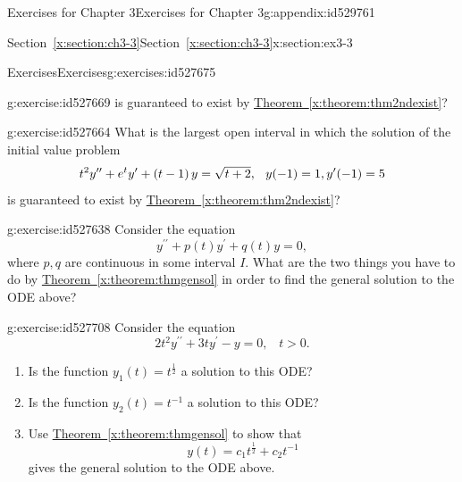 \documentclass[oneside,10pt,]{book}
\newcommand{\xreffont}{\relax}
\numberwithin{equation}{section}
\numberwithin{equation}{section}
\begin{document}
\begin{appendixptx}{Exercises for Chapter 3}{}{Exercises for Chapter 3}{}{}{g:appendix:id529761}
\begin{sectionptx}{Section~{\xreffont\ref*{x:section:ch3-3}}}{}{Section~{\xreffont\ref*{x:section:ch3-3}}}{}{}{x:section:ex3-3}
\begin{exercises-subsection-numberless}{Exercises}{}{Exercises}{}{}{g:exercises:id527675}
\begin{divisionexercise}{1}{}{}{g:exercise:id527669}
is guaranteed to exist by \hyperref[x:theorem:thm2ndexist]{Theorem~{\xreffont\ref{x:theorem:thm2ndexist}}}?%
\end{divisionexercise}%
\begin{divisionexercise}{2}{}{}{g:exercise:id527664}%
What is the largest open interval in which the solution of the initial value problem%
\begin{equation*}
t^{2}y^{\prime\prime}+e^{t}y^{\prime}+\left(t-1\right)y=\sqrt{t+2}, \hspace{.1in}
y(-1)=1,y^{\prime}(-1)=5
\end{equation*}
is guaranteed to exist by \hyperref[x:theorem:thm2ndexist]{Theorem~{\xreffont\ref{x:theorem:thm2ndexist}}}?%
\end{divisionexercise}%
\begin{divisionexercise}{3}{}{}{g:exercise:id527638}%
Consider the equation%
\begin{equation*}
y^{\prime\prime}+p(t)y^{\prime}+q(t)y=0,
\end{equation*}
where \(p,q\) are continuous in some interval \(I\). What are the two things you have to do by \hyperref[x:theorem:thmgensol]{Theorem~{\xreffont\ref{x:theorem:thmgensol}}} in order to find the general solution to the ODE above?%
\end{divisionexercise}%
\begin{divisionexercise}{4}{}{}{g:exercise:id527708}%
Consider the equation%
\begin{equation*}
2t^{2}y^{\prime\prime}+3ty^{\prime}-y=0,\,\,\,\,\,t>0.
\end{equation*}
%
%
\begin{enumerate}[label=(\alph*)]
\item{}Is the function \(y_{1}(t)=t^{\frac{1}{2}}\) a solution to this ODE?%
\item{}Is the function \(y_{2}(t)=t^{-1}\) a solution to this ODE?%
\item{}Use \hyperref[x:theorem:thmgensol]{Theorem~{\xreffont\ref{x:theorem:thmgensol}}} to show that%
\begin{equation*}
y(t)=c_{1}t^{\frac{1}{2}}+c_{2}t^{-1}
\end{equation*}
gives the general solution to the ODE above.%
\end{enumerate}
\end{divisionexercise}%
\end{exercises-subsection-numberless}
\end{sectionptx}
%
%
\typeout{************************************************}
\typeout{Section D.3 Section~{\xreffont\ref*{x:section:ch3-4}}}

\end{appendixptx}
\end{document}
